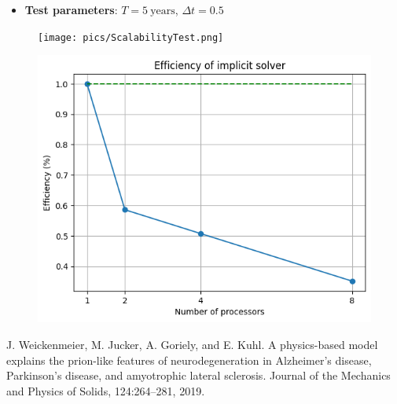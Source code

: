 \documentclass[12pt, letterpaper]{article}
\begin{document}
    

\begin{itemize}
    \item \textbf{Test parameters}: $T = 5 \ \mathrm{years}$, $\Delta t = 0.5$
\end{itemize}


\begin{figure}[h!]
    \centering
    \begin{minipage}{0.48\textwidth}
        \texttt{[image: pics/ScalabilityTest.png]}
    \end{minipage}
    \hfill
    \begin{minipage}{0.48\textwidth}
        \includegraphics[width=\linewidth]{pics/implicit_efficiency_graph.png}
    \end{minipage}
\end{figure}

\pagebreak
\begin{thebibliography}{9}
    J. Weickenmeier, M. Jucker, A. Goriely, and E. Kuhl. A physics-based model explains the prion-like features of neurodegeneration in Alzheimer’s disease, Parkinson’s disease, and amyotrophic lateral sclerosis. Journal of the Mechanics and
    Physics of Solids, 124:264–281, 2019.
\end{thebibliography}
\end{document}

